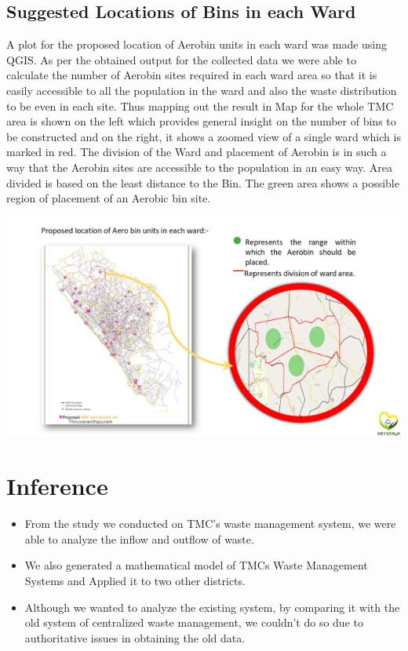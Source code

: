 \documentclass[12pt,a4paper]{report}
\begin{document}
\section{Suggested Locations of Bins in each Ward}
\begin{justify}
	 A plot for the proposed location of Aerobin units in each ward was made using QGIS. As per the obtained output for the collected data we were able to calculate the number of Aerobin sites required in each ward area so that it is easily accessible to all the population in the ward and also the waste distribution to be even in each site. Thus mapping out the result in Map for the whole TMC area is shown on the left which provides general insight on the number of bins to be constructed and on the right, it shows a zoomed view of a single ward which is marked in red. The division of the Ward and placement of Aerobin is in such a way that the Aerobin sites are accessible to the population in an easy way. Area divided is based on the least distance to the Bin. The green area shows a possible region of placement of an Aerobic bin site.
	 
	 \centering
	 \includegraphics[width=1\textwidth]{bin_loc}
\end{justify}

\chapter{\textbf{Inference}}
\begin{itemize}
	\item From the study we conducted on TMC’s waste management system, we were able to analyze the inflow and outflow of waste.
	\item We also generated a mathematical model of TMCs Waste Management Systems and Applied it to two other districts.
	\item Although we wanted to analyze the existing system, by comparing it with the old system of centralized waste management, we couldn’t do so due to authoritative issues in obtaining the old data.
\end{itemize}
\end{document}
